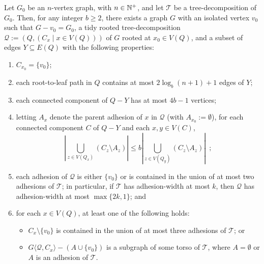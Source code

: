\documentclass{patmorin}
\renewcommand{\ge}{\geqslant}
\renewcommand{\le}{\leqslant}
\newcommand{\torso}[2]{{#1}\langle{#2}\rangle}
\newcommand{\calQ}{\mathcal{Q}}
\newcommand{\calT}{\mathcal{T}}
\begin{document}
\begin{lem}\label{all_singing_all_dancing}
  Let $G_0$ be an $n$-vertex graph, with $n\in\mathbb{N}^+$, and let $\calT$ be a tree-decomposition of $G_0$.  Then, for any integer $b\ge 2$, there exists a graph $G$ with an isolated vertex $v_0$ such that $G-v_0=G_0$, a tidy rooted tree-decomposition $\calQ:=(Q,(C_x\mid x\in V(Q)))$ of $G$ rooted at $x_0\in V(Q)$, and a subset of edges $Y\subseteq E(Q)$ with the following properties:
  \begin{enumerate}[nosep,nolistsep,label=\rm(\alph*)]
    \item\label{req:root_bag} $C_{x_0}=\{v_0\}$;
    \item\label{req:height} each root-to-leaf path in $Q$ contains at most $2\log_b(n+1) + 1$ edges of $Y$;
    \item\label{req:subtree_size} each connected component of $Q-Y$ has at most $4b-1$ vertices;
    \item\label{req:same_size} letting $A_x$ denote the parent adhesion of $x$ in $\calQ$ (with $A_{x_0}:=\emptyset$), for each connected component $C$ of $Q-Y$ and each $x,y\in V(C)$,
    \[
      \textstyle \left|\bigcup_{z\in V(Q_x)} (C_z\setminus A_z)\right| \le b \left|\bigcup_{z\in V(Q_y)} (C_z\setminus A_z)\right| \enspace ;
    \]
    \item\label{req:adhesion_width} each adhesion of $\calQ$ is either $\{v_0\}$ or is contained in the union of at most two adhesions of $\calT$; in particular, if $\calT$ has adhesion-width at most $k$, then $\calQ$ has adhesion-width at most $\max\{2k,1\}$; and
    \item\label{req:subtree_torso_apex} for each $x\in V(Q)$, at least one of the following holds: 
    \begin{itemize}[nosep,nolistsep]
      \item\label{req:three_adhesions} $C_x\setminus\{v_0\}$ is contained in the union of at most three adhesions of $\calT$; or
      \item\label{req:adhesion_torso} $\torso{G}{\calQ,C_x}-(A\cup\{v_0\})$ is a subgraph of some torso of $\calT$, where $A=\emptyset$ or $A$ is an adhesion of $\calT$.
    \end{itemize}
  \end{enumerate}
\end{lem}
\end{document}
